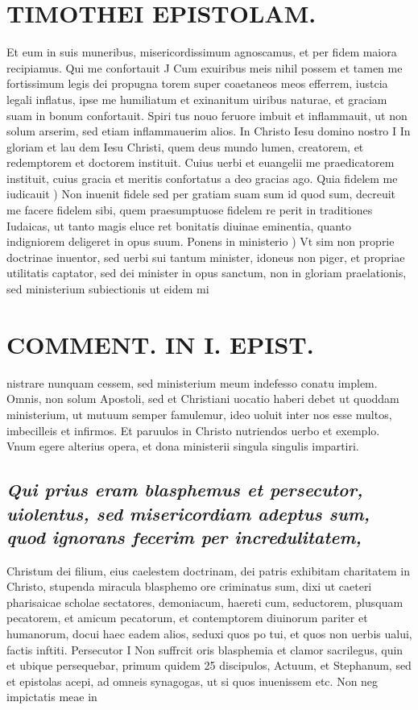 \documentclass{article}
\begin{document}
\begin{pages}
\section*{TIMOTHEI EPISTOLAM. }
\marginpar{[ p.25 ]}\pstart Et eum in suis muneribus, misericordissimum agnoscamus, et per fidem maiora recipiamus.  \pend\pstart Qui me confortauit J Cum exuiribus meis nihil possem et tamen me fortissimum legis dei propugna torem super coaetaneos meos efferrem, iustcia legali inflatus, ipse me humiliatum et exinanitum uiribus naturae, et graciam suam in bonum confortauit. Spiri tus nouo feruore imbuit et inflammauit, ut non solum arserim, sed etiam inflammauerim alios.  \pend\pstart In Christo Iesu domino nostro I In gloriam et lau dem Iesu Christi, quem deus mundo lumen, creatorem, et redemptorem et doctorem instituit. Cuius uerbi et euangelii me praedicatorem instituit, cuius gracia et meritis confortatus a deo gracias ago.  \pend\pstart Quia fidelem me iudicauit ) Non inuenit fidele sed per gratiam suam sum id quod sum, decreuit me facere fidelem sibi, quem praesumptuose fidelem re perit in traditiones Iudaicas, ut tanto magis eluce ret bonitatis diuinae eminentia, quanto indigniorem deligeret in opus suum.  \pend\pstart Ponens in ministerio ) Vt sim non proprie doctrinae inuentor, sed uerbi sui tantum minister, idoneus non piger, et propriae utilitatis captator, sed dei minister in opus sanctum, non in gloriam praelationis, sed ministerium subiectionis ut eidem mi\pend
\section*{COMMENT. IN I. EPIST. }
\marginpar{[ p.26 ]}\pstart nistrare nunquam cessem, sed ministerium meum indefesso conatu implem. Omnis, non solum Apostoli, sed et Christiani uocatio haberi debet ut quoddam ministerium, ut mutuum semper famulemur, ideo uoluit inter nos esse multos, imbecilleis et infirmos. Et paruulos in Christo nutriendos uerbo et exemplo. Vnum egere alterius opera, et dona ministerii singula singulis impartiri.  \pend
{}
{}
\subsection*{\textit{Qui prius eram blasphemus et persecutor, uiolentus, sed misericordiam adeptus sum, quod ignorans fecerim per incredulitatem, }}\pstart Christum dei filium, eius caelestem doctrinam, dei patris exhibitam charitatem in Christo, stupenda miracula blasphemo ore criminatus sum, dixi ut caeteri pharisaicae scholae sectatores, demoniacum, haereti cum, seductorem, plusquam pecatorem, et amicum pecatorum, et contemptorem diuinorum pariter et humanorum, docui haec eadem alios, seduxi quos po tui, et quos non uerbis ualui, factis inftiti.  \pend\pstart Persecutor I Non suffrcit oris blasphemia et clamor sacrilegus, quin et ubique persequebar, primum quidem 25 discipulos, Actuum, et Stephanum, sed et epistolas acepi, ad omneis synagogas, ut si quos inuenissem etc. Non neg impictatis meae in\pend

\end{pages}
\end{document}
